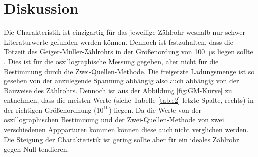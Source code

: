 \section{Diskussion}
\label{sec:Diskussion}
Die Charakteristik ist einzigartig für das jeweilige Zählrohr weshalb nur
schwer Literaturwerte gefunden werden können. Dennoch ist festzuhalten, dass
die Totzeit des Geiger-Müller-Zählrohrs in der Größenordung von \SI{100}{\micro\second}
liegen sollte \cite{wiki}. Dies ist für die oszillographische Messung gegeben,
aber nicht für die Bestimmung durch die Zwei-Quellen-Methode.
Die freigetzte Ladungsmenge ist so gesehen von der anzulegende Spannung
abhängig also auch abhängig von der Bauweise des Zählrohrs. Dennoch ist aus der
Abbildung \ref{fig:GM-Kurve} zu entnehmen, dass die meisten Werte
(siehe Tabelle \ref{tab:e2} letzte Spalte, rechts) in der richtigen
Größenordnung ($10^{10}$) liegen.  Da die Werte von der oszillographischen
Bestimmung und der Zwei-Quellen-Methode von zwei verschiedenen Appparturen
kommen können diese auch nicht verglichen werden. Die Steigung der Charakteristik
ist gering sollte aber für ein ideales Zählrohr gegen Null tendieren.


%
